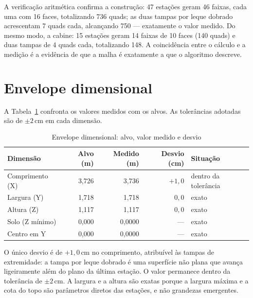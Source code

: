 A verifica{\c{c}}\~ao aritm\'etica confirma a constru{\c{c}}\~ao: 47 esta{\c{c}}\~oes geram 46
faixas, cada uma com 16 faces, totalizando 736 quads; as duas tampas por leque dobrado
acrescentam 7 quads cada, alcan{\c{c}}ando 750 --- exatamente o valor medido. Do mesmo modo,
a cabine: 15 esta{\c{c}}\~oes geram 14 faixas de 10 faces (140 quads) e duas tampas de 4 quads
cada, totalizando 148. A coincid\^encia entre o c\'alculo e a medi{\c{c}}\~ao \'e a
evid\^encia de que a malha \'e exatamente a que o algoritmo descreve.

\section{Envelope dimensional}

A Tabela~\ref{tab:envelope} confronta os valores medidos com os alvos. As toler\^ancias
adotadas s\~ao de $\pm2$\,cm em cada dimens\~ao.

\begin{table}[htbp]
\centering
\caption{Envelope dimensional: alvo, valor medido e desvio}
\label{tab:envelope}
\footnotesize
\begin{tabular}{>{\raggedright\arraybackslash}p{3.2cm}rrr>{\raggedright\arraybackslash}p{2.6cm}}
\toprule
\textbf{Dimens\~ao} & \textbf{Alvo (m)} & \textbf{Medido (m)} & \textbf{Desvio (cm)} & \textbf{Situa{\c{c}}\~ao} \\
\midrule
Comprimento (X) & 3,726 & 3,736 & $+1,0$ & dentro da toler\^ancia \\
Largura (Y) & 1,718 & 1,718 & $0,0$ & exato \\
Altura (Z) & 1,117 & 1,117 & $0,0$ & exato \\
\midrule
Solo (Z m\'inimo) & 0,000 & 0,0000 & --- & exato \\
Centro em Y & 0,000 & 0,0000 & --- & exato \\
\bottomrule
\end{tabular}
\end{table}

O \'unico desvio \'e de $+1,0$\,cm no comprimento, atribu\'ivel \`as tampas de extremidade: a
tampa por leque dobrado \'e uma superf\'icie n\~ao plana que avan{\c{c}}a ligeiramente al\'em
do plano da \'ultima esta{\c{c}}\~ao. O valor permanece dentro da toler\^ancia de
$\pm2$\,cm. A largura e a altura s\~ao exatas porque a largura m\'axima e a cota do topo
s\~ao par\^ametros diretos das esta{\c{c}}\~oes, e n\~ao grandezas emergentes.

